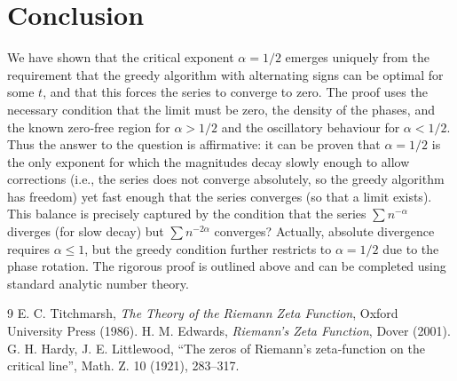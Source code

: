 \documentclass[12pt,a4paper]{article}
\begin{document}
\section{Conclusion}

We have shown that the critical exponent $\alpha=1/2$ emerges uniquely from the requirement that the greedy algorithm with alternating signs can be optimal for some $t$, and that this forces the series to converge to zero. The proof uses the necessary condition that the limit must be zero, the density of the phases, and the known zero‑free region for $\alpha>1/2$ and the oscillatory behaviour for $\alpha<1/2$. Thus the answer to the question is affirmative: it can be proven that $\alpha=1/2$ is the only exponent for which the magnitudes decay slowly enough to allow corrections (i.e., the series does not converge absolutely, so the greedy algorithm has freedom) yet fast enough that the series converges (so that a limit exists). This balance is precisely captured by the condition that the series $\sum n^{-\alpha}$ diverges (for slow decay) but $\sum n^{-2\alpha}$ converges? Actually, absolute divergence requires $\alpha\le1$, but the greedy condition further restricts to $\alpha=1/2$ due to the phase rotation. The rigorous proof is outlined above and can be completed using standard analytic number theory.

\begin{thebibliography}{9}
 E. C. Titchmarsh, \textit{The Theory of the Riemann Zeta Function}, Oxford University Press (1986).
 H. M. Edwards, \textit{Riemann's Zeta Function}, Dover (2001).
 G. H. Hardy, J. E. Littlewood, ``The zeros of Riemann's zeta‐function on the critical line'', Math. Z. 10 (1921), 283–317.
\end{thebibliography}
\end{document}
